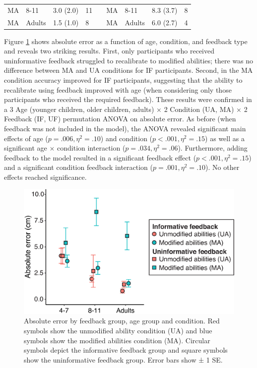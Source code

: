 \documentclass[a4paper,man,natbib,floatsintext,noextraspace]{apa6}
\begin{document}
\begin{table}
\begin{tabular}{@{}lllllllll@{}}
MA                              & 8-11                     & 3.0 (2.0)                            & 11                              &                       & MA                             & 8-11                     & 8.3 (3.7)                   & 8                      \\
MA                              & Adults                   & 1.5 (1.0)                            & 8                               &                       & MA                             & Adults                   & 6.0 (2.7)                   & 4                      \\ \bottomrule
\end{tabular}
\end{table}

Figure \ref{fig:feedback} shows absolute error as a function of age, condition, and feedback type and reveals two striking results. First, only participants who received uninformative feedback struggled to recalibrate to modified abilities; there was no difference between MA and UA conditions for IF participants. Second, in the MA condition accuracy improved for IF participants, suggesting that the ability to recalibrate using feedback improved with age (when considering only those participants who received the required feedback). These results were confirmed in a 3 Age (younger children, older children, adults) × 2 Condition (UA, MA) × 2 Feedback (IF, UF) permutation ANOVA on absolute error. As before (when feedback was not included in the model), the ANOVA revealed significant main effects of age ($p = .006, \eta^{2} = .10$) and condition ($p < .001, \eta^{2} = .15$) as well as a significant age × condition interaction ($p = .034, \eta^{2} = .06$). Furthermore, adding feedback to the model resulted in a significant feedback effect ($p < .001, \eta^{2} = .15$) and a significant condition feedback interaction ($p = .001, \eta^{2} = .10$). No other effects reached significance. 

\begin{figure}[htb!]
\centering
\includegraphics[width=1\textwidth]{feedback.eps}
\caption{\label{fig:feedback}Absolute error by feedback group, age group and condition. Red symbols show the unmodified ability condition (UA) and blue symbols show the modified abilities condition (MA). Circular symbols depict the informative feedback group and square symbols show the uninformative feedback group. Error bars show ± 1 SE.}
\end{figure}
\end{document}
